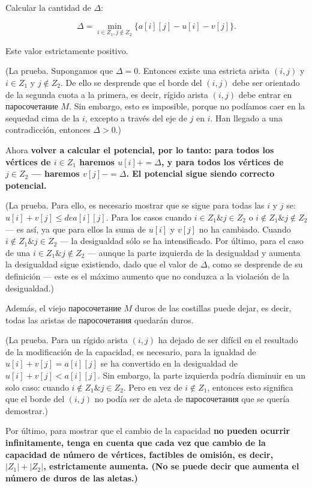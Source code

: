 {Calcular la cantidad de $\Delta$:

$$ \Delta = \min_{i \in Z_1, j \notin Z_2} \{ a[i][j] - u[i] - v[j] \}. $$

Este valor estrictamente positivo.

(La prueba. Supongamos que $\Delta = 0$. Entonces existe una estricta arista $(i,j)$ y $i \in Z_1$ y $j \notin Z_2$. De ello se desprende que el borde del $(i,j)$ debe ser orientado de la segunda cuota a la primera, es decir, rígido arista $(i,j)$ debe entrar en паросочетание $M$. Sin embargo, esto es imposible, porque no podíamos caer en la sequedad cima de la $i$, excepto a través del eje de $j$ en $i$. Han llegado a una contradicción, entonces $\Delta > 0$.)

Ahora \bf{volver a calcular el potencial}, por lo tanto: para todos los vértices de $i \in Z_1$ haremos $u[i] += \Delta$, y para todos los vértices de $j \in Z_2$ --- haremos $v[j] -= \Delta$. El potencial sigue siendo correcto potencial.

(La prueba. Para ello, es necesario mostrar que se sigue para todas las $i$ y $j$ se: $u[i] + v[j] \le de a[i][j]$. Para los casos cuando $i \in Z_1 \& j \in Z_2$ o $i \notin Z_1 \& j \notin Z_2$ --- es así, ya que para ellos la suma de $u[i]$ y $v[j]$ no ha cambiado. Cuando $i \notin Z_1 \& j \in Z_2$ --- la desigualdad sólo se ha intensificado. Por último, para el caso de una $i \in Z_1 \& j \notin Z_2$ --- aunque la parte izquierda de la desigualdad y aumenta la desigualdad sigue existiendo, dado que el valor de $\Delta$, como se desprende de su definición --- este es el máximo aumento que no conduzca a la violación de la desigualdad.)

Además, el viejo паросочетание $M$ duros de las costillas puede dejar, es decir, todas las aristas de паросочетания quedarán duros.

(La prueba. Para un rígido arista $(i,j)$ ha dejado de ser difícil en el resultado de la modificación de la capacidad, es necesario, para la igualdad de $u[i] + v[j] = a[i][j]$ se ha convertido en la desigualdad de $u[i] + v[j] < a[i][j]$. Sin embargo, la parte izquierda podría disminuir en un solo caso: cuando $i \notin Z_1 \& j \in Z_2$. Pero en vez de $i \notin Z_1$, entonces esto significa que el borde del $(i,j)$ no podía ser de aleta de паросочетания que se quería demostrar.)

Por último, para mostrar que el cambio de la capacidad \bf{no pueden ocurrir infinitamente}, tenga en cuenta que cada vez que cambio de la capacidad de número de vértices, factibles de omisión, es decir, $|Z_1|+|Z_2|$, estrictamente aumenta. (No se puede decir que aumenta el número de duros de las aletas.)

}
